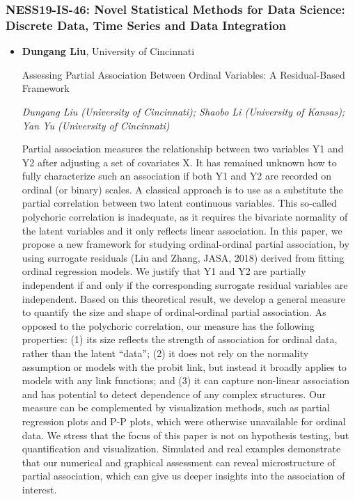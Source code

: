 \subsubsection*{NESS19-IS-46: Novel Statistical Methods for Data Science: Discrete Data, Time Series and Data Integration}

\begin{itemize}
\item \textbf{Dungang Liu}, University of Cincinnati

Assessing Partial Association Between Ordinal Variables: A Residual-Based Framework

\emph{\footnotesize Dungang Liu (University of Cincinnati); Shaobo Li (University of Kansas); Yan Yu (University of Cincinnati)}

Partial association measures the relationship between two variables Y1 and Y2 after adjusting a set of covariates X. It has remained unknown how to fully characterize such an association if both Y1 and Y2 are recorded on ordinal (or binary) scales. A classical approach is to use as a substitute the partial correlation between two latent continuous variables. This so-called polychoric correlation is inadequate, as it requires the bivariate normality of the latent variables and it only reflects linear association. In this paper, we propose a new framework for studying ordinal-ordinal partial association, by using surrogate residuals (Liu and Zhang, JASA, 2018) derived from fitting ordinal regression models. We justify that Y1 and Y2 are partially independent if and only if the corresponding surrogate residual variables are independent. Based on this theoretical result, we develop a general measure to quantify the size and shape of ordinal-ordinal partial association. As opposed to the polychoric correlation, our measure has the following properties: (1) its size reflects the strength of association for ordinal data, rather than the latent ``data''; (2) it does not rely on the normality assumption or models with the probit link, but instead it broadly applies to models with any link functions; and (3) it can capture non-linear association and has potential to detect dependence of any complex structures. Our measure can be complemented by visualization methods, such as partial regression plots and P-P plots, which were otherwise unavailable for ordinal data. We stress that the focus of this paper is not on hypothesis testing, but quantification and visualization. Simulated and real examples demonstrate that our numerical and graphical assessment can reveal microstructure of partial association, which can give us deeper insights into the association of interest.


\end{itemize}
